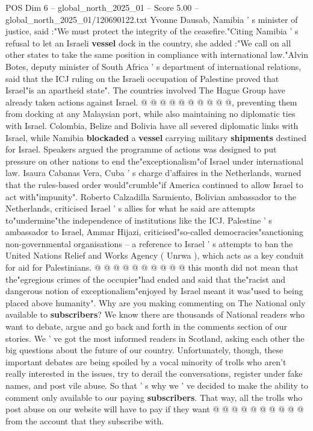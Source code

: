 \begin{textsample}{POS Dim 6 – global\_north\_2025\_01 – Score 5.00 – global\_north\_2025\_01/120690122.txt}
Yvonne Dausab, Namibia ' s minister of justice, said :"We must protect the integrity of the ceasefire."Citing Namibia ' s refusal to let an Israeli \textbf{vessel} dock in the country, she added :"We call on all other states to take the same position in compliance with international law."Alvin Botes, deputy minister of South Africa ' s department of international relations, said that the ICJ ruling on the Israeli occupation of Palestine proved that Israel"is an apartheid state".
The countries involved The Hague Group have already taken actions against Israel. @ @ @ @ @ @ @ @ @ @, preventing them from docking at any Malaysian port, while also maintaining no diplomatic ties with Israel.
Colombia, Belize and Bolivia have all severed diplomatic links with Israel, while Namibia \textbf{blockaded} a \textbf{vessel} carrying military \textbf{shipments} destined for Israel.
Speakers argued the programme of actions was designed to put pressure on other nations to end the"exceptionalism"of Israel under international law.
Isaura Cabanas Vera, Cuba ' s charge d'affaires in the Netherlands, warned that the rules-based order would"crumble"if America continued to allow Israel to act with"impunity".
Roberto Calzadilla Sarmiento, Bolivian ambassador to the Netherlands, criticised Israel ' s allies for what he said are attempts to"undermine"the independence of institutions like the ICJ.
Palestine ' s ambassador to Israel, Ammar Hijazi, criticised"so-called democracies"sanctioning non-governmental organisations -- a reference to Israel ' s attempts to ban the United Nations Relief and Works Agency ( Unrwa ), which acts as a key conduit for aid for Palestinians. @ @ @ @ @ @ @ @ @ @ this month did not mean that the"egregious crimes of the occupier"had ended and said that the"racist and dangerous notion of exceptionalism"enjoyed by Israel meant it was"used to being placed above humanity".
Why are you making commenting on The National only available to \textbf{subscribers}?
We know there are thousands of National readers who want to debate, argue and go back and forth in the comments section of our stories.
We ' ve got the most informed readers in Scotland, asking each other the big questions about the future of our country.
Unfortunately, though, these important debates are being spoiled by a vocal minority of trolls who aren't really interested in the issues, try to derail the conversations, register under fake names, and post vile abuse.
So that ' s why we ' ve decided to make the ability to comment only available to our paying \textbf{subscribers}.
That way, all the trolls who post abuse on our website will have to pay if they want @ @ @ @ @ @ @ @ @ @ from the account that they subscribe with.

\end{textsample}
